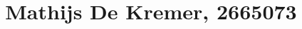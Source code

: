 \documentclass{article}
\begin{document}
\title{Mathijs De Kremer, 2665073}

\maketitle


\pagebreak

\pagebreak

\pagebreak




\end{document}
